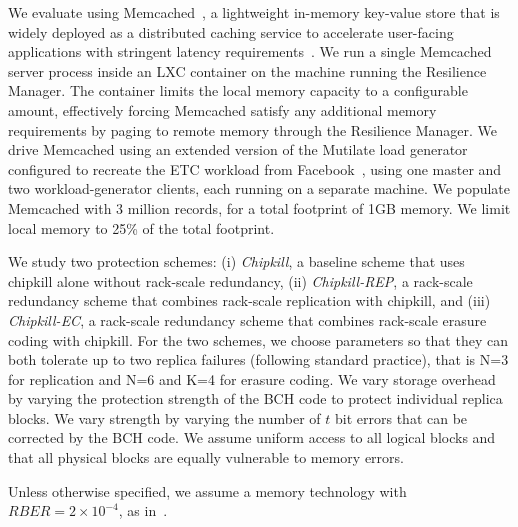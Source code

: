 We evaluate \rampdm using Memcached~\cite{memcached}, a lightweight in-memory key-value store that is widely deployed as a distributed caching service to accelerate user-facing applications with stringent latency requirements~\cite{nishtala:memcached:nsdi:2013, yang:twemcache:osdi:2020}.
We run a single Memcached server process inside an LXC container on the machine running the Resilience Manager. The container limits the local memory capacity to a configurable amount, effectively forcing Memcached satisfy any additional memory requirements by paging to remote memory through the Resilience Manager.
We drive Memcached using an extended version of the Mutilate load generator~\cite{leverich:mutilate:eurosys:2014} configured to recreate the ETC workload from Facebook~\cite{berk:facebook-kv-workload:sigmetrics:2012}, using one master and two workload-generator clients, each running on a separate machine. 
We populate Memcached with 3 million records, for a total footprint of 1GB memory.
We limit local memory to 25\% of the total footprint.

\newcommand{\chipkill}{\emph{Chipkill}\xspace}
\newcommand{\chipkillrep}{\emph{Chipkill-REP}\xspace}
\newcommand{\chipkillec}{\emph{Chipkill-EC}\xspace}

We study two protection schemes: 
(i) \chipkill, a baseline scheme that uses chipkill alone without rack-scale redundancy, 
(ii) \chipkillrep, a rack-scale redundancy scheme that combines rack-scale replication with chipkill, and 
(iii) \chipkillec, a rack-scale redundancy scheme that combines rack-scale erasure coding with chipkill. 
For the two schemes, we choose parameters so that they can both tolerate up to two replica failures (following standard practice), that is N=3 for replication and N=6 and K=4 for erasure coding.
We vary storage overhead by varying the protection strength of the BCH code to protect individual replica blocks.
We vary strength by varying the number of $t$ bit errors that can be corrected by the BCH code.
We assume uniform access to all logical blocks and that all physical blocks are equally vulnerable to memory errors.

Unless otherwise specified, we assume a memory technology with $RBER=2\times10^{-4}$, as in~\cite{zhang:pm-chipkill:micro:2018}.
